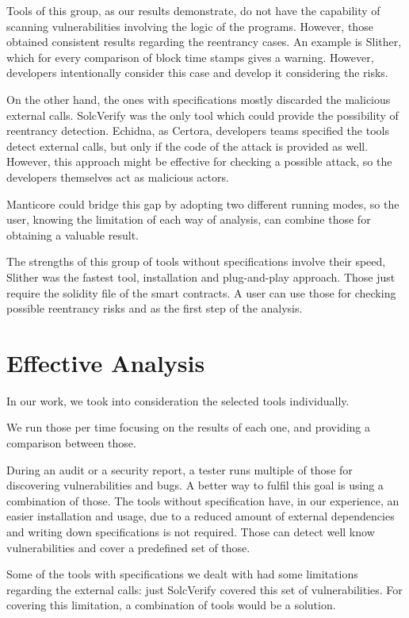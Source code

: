 Tools of this group, as our results demonstrate, do not have the capability of scanning vulnerabilities involving the logic of the programs. 
However, those obtained consistent results regarding the reentrancy cases. 
An example is Slither, which for every comparison of block time stamps gives a warning. However, developers intentionally consider this case and develop it considering the risks. 

On the other hand, the ones with specifications mostly discarded the malicious external calls. 
SolcVerify was the only tool which could provide the possibility of reentrancy detection. Echidna, as Certora, developers teams specified the tools detect external calls, but only if the code of the attack is provided as well.
However, this approach might be effective for checking a possible attack, so the developers themselves act as malicious actors.

Manticore could bridge this gap by adopting two different running modes, so the user, knowing the limitation of each way of analysis, can combine those for obtaining a valuable result.

The strengths of this group of tools without specifications involve their speed, Slither was the fastest tool, installation and plug-and-play approach. 
Those just require the solidity file of the smart contracts. A user can use those for checking possible reentrancy risks and as the first step of the analysis.

\section{Effective Analysis}
In our work, we took into consideration the selected tools individually. 

We run those per time focusing on the results of each one, and providing a comparison between those.

During an audit or a security report, a tester runs multiple of those for discovering vulnerabilities and bugs. 
A better way to fulfil this goal is using a combination of those. 
The tools without specification have, in our experience, an easier installation and usage, 
due to a reduced amount of external dependencies and writing down specifications is not required.
Those can detect well know vulnerabilities and cover a predefined set of those. 

Some of the tools with specifications we dealt with had some limitations regarding the external calls: just SolcVerify covered this set of vulnerabilities. 
For covering this limitation, a combination of tools would be a solution. 

